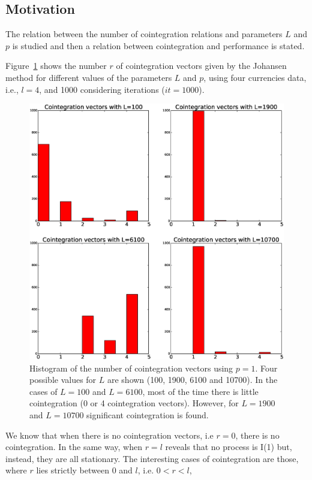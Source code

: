 \subsection{Motivation}
The relation between the number of cointegration relations
and parameters $L$ and $p$ is studied and then a relation between cointegration
and performance is stated.

Figure~\ref{fig:hists} shows the number $r$ of cointegration vectors given by
the Johansen method for different values of the parameters $L$ and $p$, using
four currencies data, i.e., $l=4$, and 1000 considering iterations ($it=1000$).
\begin{figure}[!h]
  \centering
  \includegraphics[width=\textwidth]{img/histCointVectors}
  \caption{Histogram of the number of cointegration vectors using $p=1$. Four
  possible values for $L$ are shown (100, 1900, 6100 and 10700).
  In the cases of $L=100$ and $L=6100$, most of the time there is little
  cointegration (0 or 4 cointegration vectors). However, for $L=1900$ and
  $L=10700$ significant cointegration is found.}
  \label{fig:hists}
\end{figure}
We know that when there is no cointegration vectors, i.e $r=0$, 
there is no cointegration. In the same way, when $r=l$ reveals that no process is I(1) but,
instead, they are all stationary.
The interesting cases of cointegration are those, where $r$ lies strictly
between $0$ and $l$, i.e. $0<r<l$, 

